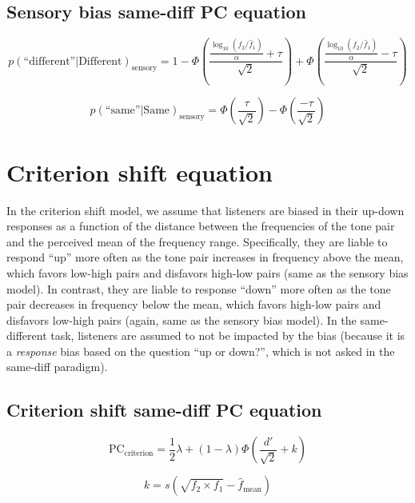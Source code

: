 \documentclass[11pt]{article}
\begin{document}
\subsection{Sensory bias same-diff PC equation}

\begin{equation}
		p(\text{``different''}|\text{Different})_\text{sensory} = 1 - \Phi\left( \frac{\frac{\log_{10}(f_2/\hat{f}_1)}{\alpha} + \tau}{\sqrt{2}} \right) + \Phi\left(\frac{\frac{\log_{10}(f_2/\hat{f}_1)}{\alpha} -\tau}{\sqrt{2}} \right) 
\end{equation}

\begin{equation}
		p(\text{``same''}|\text{Same})_\text{sensory} = \Phi\left( \frac{\tau}{\sqrt{2}} \right) - \Phi\left(\frac{-\tau}{\sqrt{2}} \right) 
\end{equation}

\section{Criterion shift equation}

In the criterion shift model, we assume that listeners are biased in their up-down responses as a function of the distance between the frequencies of the tone pair and the perceived mean of the frequency range.
Specifically, they are liable to respond ``up'' more often as the tone pair increases in frequency above the mean, which favors low-high pairs and disfavors high-low pairs (same as the sensory bias model).
In contrast, they are liable to response ``down'' more often as the tone pair decreases in frequency below the mean, which favors high-low pairs and disfavors low-high pairs (again, same as the sensory bias model). 
In the same-different task, listeners are assumed to not be impacted by the bias (because it is a \emph{response} bias based on the question ``up or down?'', which is not asked in the same-diff paradigm). 

\subsection{Criterion shift same-diff PC equation}

\begin{equation}
		\text{PC}_\text{criterion} = \frac{1}{2} \lambda + (1 - \lambda) \Phi \left(\frac{d'}{\sqrt{2}} + k\right)
\end{equation}

\begin{equation}
		k = s \left( \sqrt{f_2 \times f_1} - \hat{f}_\text{mean} \right)
\end{equation}
\end{document}
